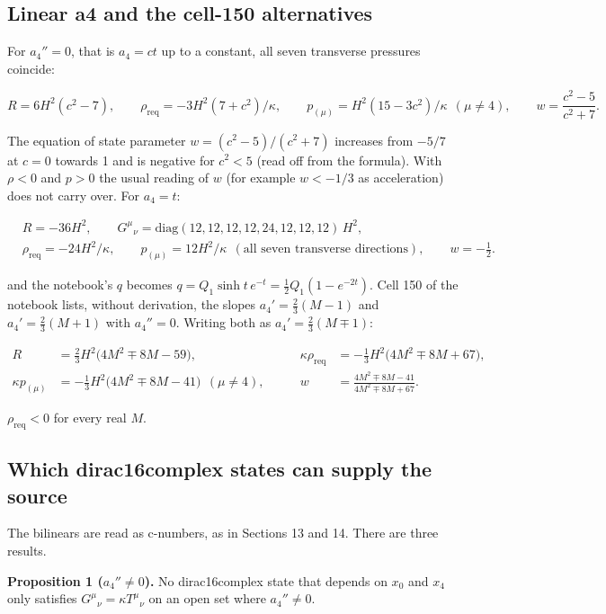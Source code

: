 \documentclass[11pt]{article}
\begin{document}
\subsection{Linear a4 and the cell-150 alternatives}

For $a_4''=0$, that is $a_4=ct$ up to a constant, all seven transverse pressures coincide:

\[
R=6H^2(c^2-7),\qquad \rho_{\mathrm{req}}=-3H^2(7+c^2)/\kappa,\qquad p_{(\mu)}=H^2(15-3c^2)/\kappa\ \ (\mu\ne4),\qquad w=\frac{c^2-5}{c^2+7} .
\]

The equation of state parameter $w=(c^2-5)/(c^2+7)$ increases from $-5/7$ at $c=0$ towards 1 and is negative for $c^2<5$ (read off from the formula). With $\rho<0$ and $p>0$ the usual reading of $w$ (for example $w<-1/3$ as acceleration) does not carry over. For $a_4=t$:

\[
\begin{aligned}
&R=-36H^2,\qquad G^\mu{}_\nu=\mathrm{diag}(12,12,12,12,24,12,12,12)\,H^2, \\
&\rho_{\mathrm{req}}=-24H^2/\kappa,\qquad p_{(\mu)}=12H^2/\kappa\ \ (\text{all seven transverse directions}),\qquad w=-\tfrac12 .
\end{aligned}
\]

and the notebook's $q$ becomes $q=Q_1\sinh t\,e^{-t}=\tfrac12Q_1(1-e^{-2t})$. Cell 150 of the notebook lists, without derivation, the slopes $a_4'=\tfrac23(M-1)$ and $a_4'=\tfrac23(M+1)$ with $a_4''=0$. Writing both as $a_4'=\tfrac23(M\mp1)$:

\[
\begin{aligned}
R&=\tfrac23H^2\bigl(4M^2\mp8M-59\bigr), &\qquad \kappa\rho_{\mathrm{req}}&=-\tfrac13H^2\bigl(4M^2\mp8M+67\bigr), \\
\kappa p_{(\mu)}&=-\tfrac13H^2\bigl(4M^2\mp8M-41\bigr)\ \ (\mu\ne4), &\qquad w&=\frac{4M^2\mp8M-41}{4M^2\mp8M+67} .
\end{aligned}
\]

$\rho_{\mathrm{req}}<0$ for every real $M$.

\subsection{Which dirac16complex states can supply the source}

The bilinears are read as c-numbers, as in Sections 13 and 14. There are three results.

\textbf{Proposition 1 ($a_4''\ne0$).} No dirac16complex state that depends on $x_0$ and $x_4$ only satisfies $G^\mu{}_\nu=\kappa T^\mu{}_\nu$ on an open set where $a_4''\ne0$.
\end{document}
